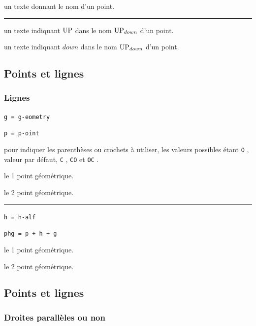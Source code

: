 \documentclass[12pt,a4paper]{book}
\theoremstyle{definition}
\newcommand\separation{
	\medskip
	\hfill\rule{0.5\textwidth}{0.75pt}\hfill
	\medskip
}
\newcommand\extraspace{
	\vspace{0.25em}
}
\newcommand\mwhyprefix[2]{%
	\texttt{#1 = #1-#2}%
}
\newcommand\prefix[1]{%
	\texttt{#1}%
}
\begin{document}
{{\IDarg{} un texte donnant le nom d'un point.


\separation



 un texte indiquant $\pt{UP}$ dans le nom $\pt*{UP}{down}$ d'un point.

 un texte indiquant $down$ dans le nom $\pt*{UP}{down}$ d'un point.




\subsection{Points et lignes}

\subsubsection{Lignes}



  \hfill \mwhyprefix{g}{eometry}

  \hfill \mwhyprefix{p}{oint}

\IDoption{} pour indiquer les parenthèses ou crochets à utiliser, les valeurs possibles étant \prefix{O}, valeur par défaut, \prefix{C}, \prefix{CO} et \prefix{OC}.

 le 1\ier{} point géométrique.

 le 2\ieme{} point géométrique.


\separation


  \hfill \mwhyprefix{h}{alf}

  \hfill \prefix{phg = p + h + g}

\extraspace



 le 1\ier{} point géométrique.

 le 2\ieme{} point géométrique.




\subsection{Points et lignes}

\subsubsection{Droites parallèles ou non}



}}
\end{document}
